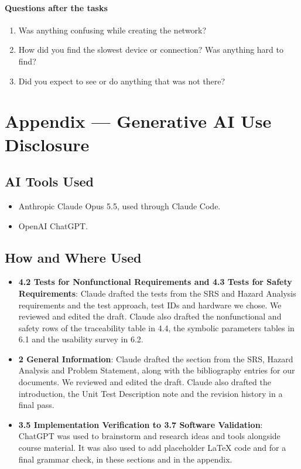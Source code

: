 \documentclass[12pt, titlepage]{article}
\begin{document}
\paragraph{Questions after the tasks}
\begin{enumerate}
  \item Was anything confusing while creating the network?
  \item How did you find the slowest device or connection? Was anything hard
    to find?
  \item Did you expect to see or do anything that was not there?
\end{enumerate}

\clearpage

\section{Appendix --- Generative AI Use Disclosure}

\subsection{AI Tools Used}

\begin{itemize}
    \item Anthropic Claude Opus 5.5, used through Claude Code.
    \item OpenAI ChatGPT.
\end{itemize}

\subsection{How and Where Used}

\begin{itemize}
    \item \textbf{4.2 Tests for Nonfunctional Requirements and 4.3 Tests for
    Safety Requirements}: Claude drafted the tests from the SRS and Hazard
    Analysis requirements and the test approach, test IDs and hardware we
    chose. We reviewed and edited the draft. Claude also drafted the
    nonfunctional and safety rows of the traceability table in 4.4, the
    symbolic parameters tables in 6.1 and the usability survey in 6.2.
    \item \textbf{2 General Information}: Claude drafted the section from the
    SRS, Hazard Analysis and Problem Statement, along with the bibliography
    entries for our documents. We reviewed and edited the draft. Claude also
    drafted the introduction, the Unit Test Description note and the
    revision history in a final pass.
    \item \textbf{3.5 Implementation Verification to 3.7 Software
    Validation}: ChatGPT was used to brainstorm and research ideas and tools
    alongside course material. It was also used to add placeholder \LaTeX{}
    code and for a final grammar check, in these sections and in the appendix.
\end{itemize}
\end{document}
